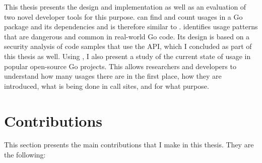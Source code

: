 This thesis presents the design and implementation as well as an evaluation of two novel developer tools for this
purpose.
\toolGeiger{} can find and count \unsafe{} usages in a Go package and its dependencies and is therefore similar to
\toolCargoGeiger{}.
\toolSafer{} identifies \unsafe{} usage patterns that are dangerous and common in real-world Go code.
Its design is based on a security analysis of code samples that use the \unsafe{} \acrshort{API}, which I concluded as
part of this thesis as well.
Using \toolGeiger{}, I also present a study of the current state of \unsafe{} usage in popular open-source Go projects.
This allows researchers and developers to understand how many usages there are in the first place, how they are
introduced, what is being done in \unsafe{} call sites, and for what purpose.




\section{Contributions}\label{sec:contributions}

This section presents the main contributions that I make in this thesis.
They are the following:

